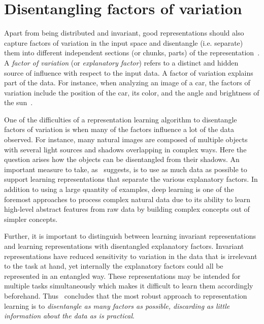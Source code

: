 \documentclass[a4paper,12pt]{report}
\begin{document}
\section{Disentangling factors of variation}\label{subsec:unsupDFoV}
Apart from being distributed and invariant, good representations should also capture factors of variation in the input space and disentangle (i.e. separate) them into different independent sections (or chunks, parts) of the representation~\cite{ReprLearning}. A \textit{factor of variation} (or \textit{explanatory factor}) refers to a distinct and hidden source of influence with respect to the input data. A factor of variation explains part of the data. For instance, when analyzing an image of a car, the factors of variation include the position of the car, its color, and the angle and brightness of the sun~\cite{DeepLearningBook}.

One of the difficulties of a representation learning algorithm to disentangle factors of variation is when many of the factors influence a lot of the data observed. For instance, many natural images are composed of multiple objects with several light sources and shadows overlapping in complex ways. Here the question arises how the objects can be disentangled from their shadows. An important measure to take, as~\cite{ReprLearning} suggests, is to use as much data as possible to support learning representations that separate the various explanatory factors. In addition to using a large quantity of examples, deep learning is one of the foremost approaches to process complex natural data due to its ability to learn high-level abstract features from raw data by building complex concepts out of simpler concepts. 

Further, it is important to distinguish between learning invariant representations and learning representations with disentangled explanatory factors. Invariant representations have reduced sensitivity to variation in the data that is irrelevant to the task at hand, yet internally the explanatory factors could all be represented in an entangled way. These representations may be intended for multiple tasks simultaneously which makes it difficult to learn them accordingly beforehand. Thus~\cite{ReprLearning} concludes that the most robust approach to representation learning is to \textit{disentangle as many factors as possible, discarding as little information about the data as is practical}.
\end{document}
